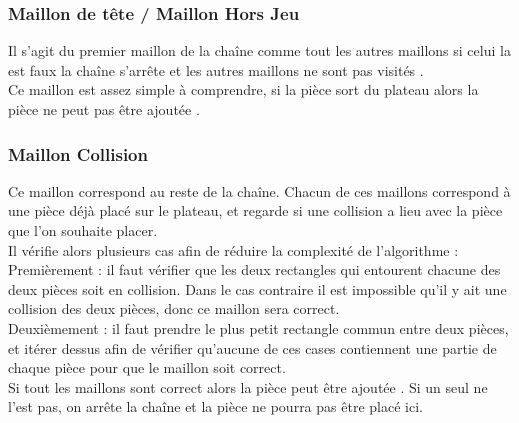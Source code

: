\documentclass[a4paper,12pt]{article} %
\begin{document}
\subsubsection{Maillon de tête / Maillon Hors Jeu}
Il s'agit du premier maillon de la chaîne comme tout les autres maillons si celui la est faux la chaîne s’arrête et les autres maillons ne sont pas visités .\\
Ce maillon est assez simple à comprendre, si la pièce sort du plateau alors la pièce ne peut pas être ajoutée .\\
\subsubsection{Maillon Collision}
Ce maillon correspond au reste de la chaîne. Chacun de ces maillons correspond à une pièce déjà placé sur le plateau, et regarde si une collision a lieu avec la pièce que l'on souhaite placer. \\
Il vérifie alors plusieurs cas afin de réduire la complexité de l'algorithme :\\
Premièrement : il faut vérifier que les deux rectangles qui entourent chacune des deux pièces soit en collision. Dans le cas contraire il est impossible qu'il y ait une collision des deux pièces, donc ce maillon sera correct.\\
Deuxièmement : il faut prendre le plus petit rectangle commun entre deux pièces,  et itérer dessus afin de vérifier qu'aucune de ces cases contiennent une partie de chaque pièce pour que le maillon soit correct.\\
Si tout les maillons sont correct alors la pièce peut être ajoutée . Si un seul ne l'est pas, on arrête la chaîne et la pièce ne pourra pas être placé ici.\\
\end{document}
